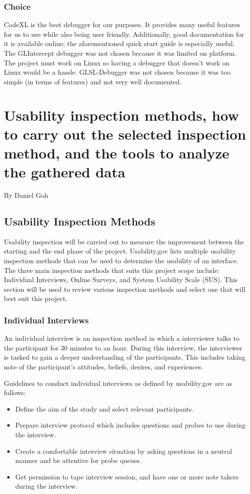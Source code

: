 \documentclass[10pt,journal,compsoc,draftclsnofoot]{IEEEtran}
\begin{document}
\subsubsection{Choice}
CodeXL is the best debugger for our purposes.
It provides many useful features for us to use while also being user friendly. 
Additionally, good documentation for it is available online; the aforementioned quick start guide is especially useful.
The GLIntercept debugger was not chosen because it was limited on platform.
The project must work on Linux so having a debugger that doesn't work on Linux would be a hassle.
GLSL-Debugger was not chosen because it was too simple (in terms of features) and not very well documented.

\newpage

\section{Usability inspection methods, how to carry out the selected inspection method, and the tools to analyze the gathered data}
\large{By Daniel Goh}

\normalsize
\subsection{Usability Inspection Methods}
Usability inspection will be carried out to measure the improvement between the starting and the end phase of the project.
Usability.gov lists multiple usability inspection methods that can be used to determine the usability of an interface.
The three main inspection methods that suits this project scope include: Individual Interviews, Online Surveys, and System Usability Scale (SUS). \cite{userResearch}
This section will be used to review various inspection methods and select one that will best suit this project.

\subsubsection{Individual Interviews \cite{userResearch}}
An individual interview is an inspection method in which a interviewer talks to the participant for 30 minutes to an hour.
During this interview, the interviewer is tasked to gain a deeper understanding of the participants.
This includes taking note of the participant's attitudes, beliefs, desires, and experiences.

Guidelines to conduct individual interviews as defined by usability.gov are as follows:
\begin{itemize}
\item Define the aim of the study and select relevant participants.
\item Prepare interview protocol which includes questions and probes to use during the interview.
\item Create a comfortable interview situation by asking questions in a neutral manner and be attentive for probe queues.
\item Get permission to tape interview session, and have one or more note takers during the interview.
\end{itemize}
\end{document}
